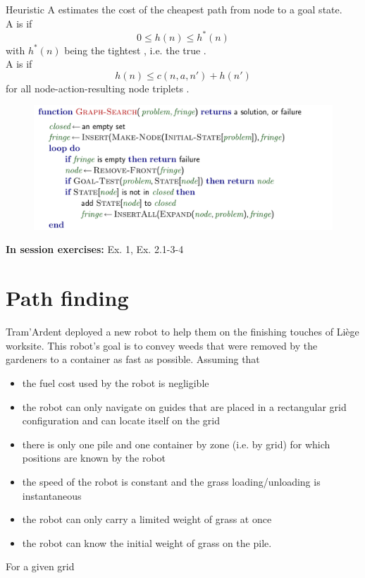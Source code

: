 \documentclass[11pt, a4paper]{article}
\begin{document}
\begin{thbox}{Heuristic}
    A  estimates the cost of the cheapest path from node  to a goal state.\\
    A  is  if
    $$0 \leq h(n) \leq h^*(n)$$
    with $h^*(n)$ being the tightest , i.e. the true .\\
    A  is  if
    $$h(n) \leq c(n,a,n') + h(n')$$
    for all node-action-resulting node triplets .
\end{thbox}

\begin{figure}[h]
    \centering
    \includegraphics[width=.9\linewidth]{figures/graph-search.png}
\end{figure}


\textbf{In session exercises:} Ex. 1, Ex. 2.1-3-4 

\newpage

\section{Path finding}

Tram'Ardent deployed a new robot to help them on the finishing touches of Liège worksite. This robot's goal is to convey weeds that were removed by the gardeners to a container as fast as possible. Assuming that 
\begin{itemize}
    \item the fuel cost used by the robot is negligible
    \item the robot can only navigate on guides that are placed in a rectangular grid configuration and can locate itself on the grid
    \item there is only one pile and one container by zone (i.e. by grid) for which positions are known by the robot
    \item the speed of the robot is constant and the grass loading/unloading is instantaneous
    \item the robot can only carry a limited weight of grass at once
    \item the robot can know the initial weight of grass on the pile.
\end{itemize}
For a given grid
\end{document}
